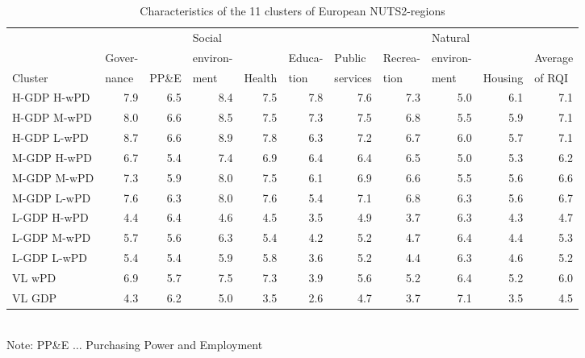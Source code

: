 \documentclass[a4paper,twoside]{article}
\begin{document}
\begin{sidewaystable}
\caption{Characteristics of the 11 clusters of European NUTS2-regions}
\label{tab:sideways}

{ %
\setlength{\tabcolsep}{13pt}
\renewcommand{\arraystretch}{1.8}
    \begin{tabular*}{\textwidth}{lrrrrrrrrrr}
    \toprule
          &       & \multicolumn{1}{l}{} & \multicolumn{1}{l}{Social} &       &       &       &       & \multicolumn{1}{l}{Natural} &       &  \\
          & \multicolumn{1}{l}{Gover-} & \multicolumn{1}{l}{} & \multicolumn{1}{l}{environ-} &       & \multicolumn{1}{l}{Educa-} & \multicolumn{1}{l}{Public} & \multicolumn{1}{l}{Recrea-} & \multicolumn{1}{l}{environ-} &       & \multicolumn{1}{l}{Average} \\
    Cluster & \multicolumn{1}{l}{nance} & \multicolumn{1}{l}{PP\&E}  & \multicolumn{1}{l}{ment}  & \multicolumn{1}{l}{Health} & \multicolumn{1}{l}{tion}  & \multicolumn{1}{l}{services} & \multicolumn{1}{l}{tion}  & \multicolumn{1}{l}{ment}  & \multicolumn{1}{l}{Housing} & \multicolumn{1}{l}{of RQI} \\
    \midrule
    H-GDP H-wPD & 7.9   & 6.5   & 8.4   & 7.5   & 7.8   & 7.6   & 7.3   & 5.0   & 6.1   & 7.1 \\
    H-GDP M-wPD & 8.0   & 6.6   & 8.5   & 7.5   & 7.3   & 7.5   & 6.8   & 5.5   & 5.9   & 7.1 \\
    H-GDP L-wPD & 8.7   & 6.6   & 8.9   & 7.8   & 6.3   & 7.2   & 6.7   & 6.0   & 5.7   & 7.1 \\[3mm]
    M-GDP H-wPD & 6.7   & 5.4   & 7.4   & 6.9   & 6.4   & 6.4   & 6.5   & 5.0   & 5.3   & 6.2 \\
    M-GDP M-wPD & 7.3   & 5.9   & 8.0   & 7.5   & 6.1   & 6.9   & 6.6   & 5.5   & 5.6   & 6.6 \\
    M-GDP L-wPD & 7.6   & 6.3   & 8.0   & 7.6   & 5.4   & 7.1   & 6.8   & 6.3   & 5.6   & 6.7 \\[3mm]
    L-GDP H-wPD & 4.4   & 6.4   & 4.6   & 4.5   & 3.5   & 4.9   & 3.7   & 6.3   & 4.3   & 4.7 \\
    L-GDP M-wPD & 5.7   & 5.6   & 6.3   & 5.4   & 4.2   & 5.2   & 4.7   & 6.4   & 4.4   & 5.3 \\
    L-GDP L-wPD & 5.4   & 5.4   & 5.9   & 5.8   & 3.6   & 5.2   & 4.4   & 6.3   & 4.6   & 5.2 \\[3mm]
    VL wPD      & 6.9   & 5.7   & 7.5   & 7.3   & 3.9   & 5.6   & 5.2   & 6.4   & 5.2   & 6.0 \\
    VL GDP      & 4.3   & 6.2   & 5.0   & 3.5   & 2.6   & 4.7   & 3.7   & 7.1   & 3.5   & 4.5 \\
    \bottomrule
    \end{tabular*}%
\\[3mm]Note: PP\&E $\ldots$ Purchasing Power and Employment
}
\end{sidewaystable}
\end{document}
